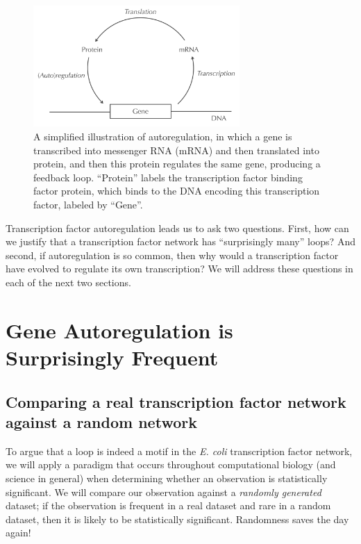 \begin{figure}[h]
\centering
\mySfFamily
\includegraphics[width = 0.7\textwidth]{../images/autoregulation_example.png}
\caption{A simplified illustration of autoregulation, in which a gene is transcribed into messenger RNA (mRNA) and then translated into protein, and then this protein regulates the same gene, producing a feedback loop. ``Protein'' labels the transcription factor binding factor protein, which binds to the DNA encoding this transcription factor, labeled by ``Gene''.}
\label{fig:autoregulation_example}
\end{figure}

Transcription factor autoregulation leads us to ask two questions. First, how can we justify that a transcription factor network has ``surprisingly many'' loops? And second, if autoregulation is so common, then why would a transcription factor have evolved to regulate its own transcription? We will address these questions in each of the next two sections.\\


\FloatBarrier
{}

\section{Gene Autoregulation is Surprisingly Frequent}
\label{sec:gene_autoregulation_is_surprisingly_frequent}

\subsection{Comparing a real transcription factor network against a random network}

To argue that a loop is indeed a motif in the \textit{E. coli} transcription factor network, we will apply a paradigm that occurs throughout computational biology (and science in general) when determining whether an observation is statistically significant. We will compare our observation against a  \textit{randomly generated} dataset; if the observation is frequent in a real dataset and rare in a random dataset, then it is likely to be statistically significant. Randomness saves the day again!\\

